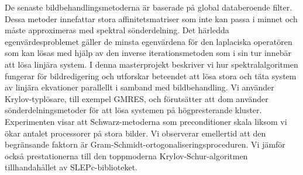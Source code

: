 De senaste bildbehandlingsmetoderna är baserade på global databeroende filter.
Dessa metoder innefattar stora affinitetsmatriser som inte kan passa i minnet och måste approximeras med spektral sönderdelning.
Det härledda egenvärdesproblemet gäller de minsta egenvärdena för den laplaciska operatören som kan lösas med hjälp av den inverse iterationsmetoden som i sin tur innebär att lösa linjära system.
I denna masterprojekt beskriver vi hur spektralalgoritmen fungerar för bildredigering och utforskar beteendet att lösa stora och täta system av linjära ekvationer parallellt i samband med bildbehandling.
Vi använder Krylov-typlösare, till exempel GMRES, och förutsätter att dom använder sönderdelningsmetoder för att lösa systemen på högpresterande kluster.
Experimenten visar att Schwarz-metoderna som preconditioner skala liksom vi ökar antalet processorer på stora bilder.
Vi observerar emellertid att den begränsande faktorn är Gram-Schmidt-ortogonaliseringsproceduren.
Vi jämför också prestationerna till den toppmoderna Krylov-Schur-algoritmen tillhandahållet av SLEPc-biblioteket.
